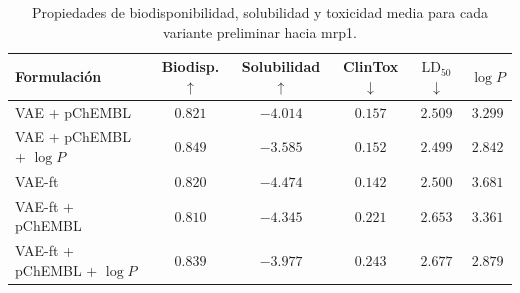 \begin{table}[htbp]
\centering
\caption{Propiedades de biodisponibilidad, solubilidad y toxicidad media para cada variante preliminar hacia \acrshort{mrp1}.}
\label{tab:admet_exp5_2}
\begin{tabular}{lccccc}
\toprule
Formulación & Biodisp. $\uparrow$ & Solubilidad $\uparrow$ & ClinTox $\downarrow$ & $\text{LD}_{50}$ $\downarrow$ & $\log P$ \\
\midrule
VAE + pChEMBL & $0.821$ & $-4.014$ & $0.157$ & $2.509$ & $3.299$ \\
VAE + pChEMBL + $\log P$ & $0.849$ & $-3.585$ & $0.152$ & $2.499$ & $2.842$ \\
\midrule
VAE-ft & $0.820$ & $-4.474$ & $0.142$ & $2.500$ & $3.681$ \\
VAE-ft + pChEMBL & $0.810$ & $-4.345$ & $0.221$ & $2.653$ & $3.361$ \\
VAE-ft + pChEMBL + $\log P$ & $0.839$ & $-3.977$ & $0.243$ & $2.677$ & $2.879$ \\
\bottomrule
\end{tabular}
\end{table}
